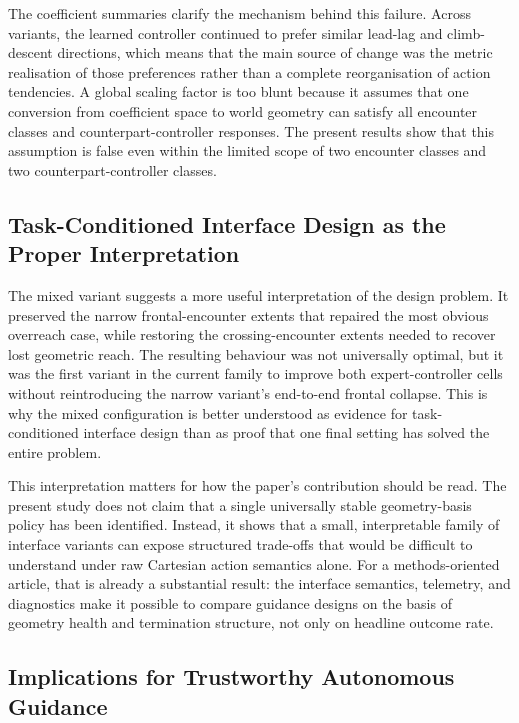 \documentclass[drones,article,submit,pdftex,moreauthors]{Definitions/mdpi}
\begin{document}
The coefficient summaries clarify the mechanism behind this failure. Across variants, the learned controller continued to prefer similar lead-lag and climb-descent directions, which means that the main source of change was the metric realisation of those preferences rather than a complete reorganisation of action tendencies. A global scaling factor is too blunt because it assumes that one conversion from coefficient space to world geometry can satisfy all encounter classes and counterpart-controller responses. The present results show that this assumption is false even within the limited scope of two encounter classes and two counterpart-controller classes.

\subsection{Task-Conditioned Interface Design as the Proper Interpretation}

The mixed variant suggests a more useful interpretation of the design problem. It preserved the narrow frontal-encounter extents that repaired the most obvious overreach case, while restoring the crossing-encounter extents needed to recover lost geometric reach. The resulting behaviour was not universally optimal, but it was the first variant in the current family to improve both expert-controller cells without reintroducing the narrow variant's end-to-end frontal collapse. This is why the mixed configuration is better understood as evidence for task-conditioned interface design than as proof that one final setting has solved the entire problem.

This interpretation matters for how the paper's contribution should be read. The present study does not claim that a single universally stable geometry-basis policy has been identified. Instead, it shows that a small, interpretable family of interface variants can expose structured trade-offs that would be difficult to understand under raw Cartesian action semantics alone. For a methods-oriented article, that is already a substantial result: the interface semantics, telemetry, and diagnostics make it possible to compare guidance designs on the basis of geometry health and termination structure, not only on headline outcome rate.

\subsection{Implications for Trustworthy Autonomous Guidance}
\end{document}
